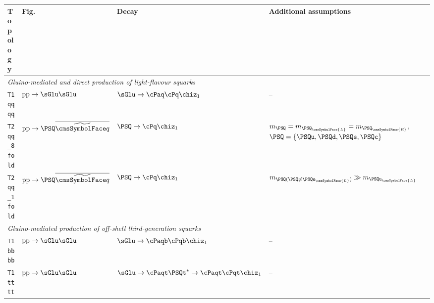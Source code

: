 \begin{table}[!t]
  \label{tab:simplified-models}
  \centering
  \footnotesize
  \begin{tabular}{ llll }
    \hline
Topology               & Fig.
                       & Decay
                       & Additional assumptions                                                         \\ [0.5ex]
\hline
\multicolumn{4}{l}{\it Gluino-mediated and direct production of light-flavour squarks}       \\ [0.5ex]
\texttt{T1qqqq}        %
                       & $\text{pp}\ra\sGlu\sGlu$
                       & $\sGlu\ra\cPaq\cPq\chiz_1$
                       & --                                                                             \\ [0.5ex]
\texttt{T2qq\_8fold}   %
                       & $\text{pp}\ra\PSQ\PASQ$        
                       & $\PSQ\ra\cPq\chiz_1$
                       & $m_{\PSQ} = m_{\PSQ_\cmsSymbolFace{L}} = m_{\PSQ_\cmsSymbolFace{R}}$,
                       $\PSQ = \{ \PSQu, \PSQd, \PSQs, \PSQc \}$                                        \\ [0.5ex]
\texttt{T2qq\_1fold}   %
                       & $\text{pp}\ra\PSQ\PASQ$         
                       & $\PSQ\ra\cPq\chiz_1$
                       & $m_{\PSQ (\PSQ \neq \PSQu_\cmsSymbolFace{L})} \gg m_{\PSQu_\cmsSymbolFace{L}}$ \\ [0.5ex]
\multicolumn{4}{l}{\it Gluino-mediated production of off-shell third-generation squarks}               \\ [0.5ex]
\texttt{T1bbbb}        %
                       & $\text{pp}\ra\sGlu\sGlu$       
                       & $\sGlu\ra\cPaqb\cPqb\chiz_1$
                       & --                                                                             \\ [0.5ex]
\texttt{T1tttt}        %
                       & $\text{pp}\ra\sGlu\sGlu$       
                       & $\sGlu\ra\cPaqt\PSQt^*\ra\cPaqt\cPqt\chiz_1$
                       & --                                                                             \\ [0.5ex]

\end{tabular}
\end{table}
